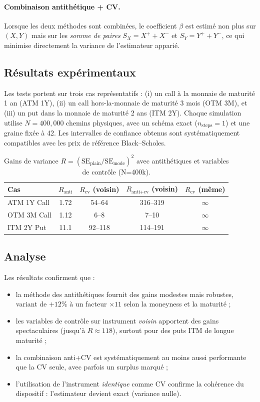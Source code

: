 \documentclass[a4paper,11pt]{article}
\begin{document}
\paragraph{Combinaison antithétique + CV.}
Lorsque les deux méthodes sont combinées, le coefficient $\beta$ est estimé non
plus sur $(X,Y)$ mais sur les \emph{somme de paires}
$S_X=X^{+}+X^{-}$ et $S_Y=Y^{+}+Y^{-}$, ce qui minimise directement la variance
de l’estimateur apparié.

\subsection{Résultats expérimentaux}
Les tests portent sur trois cas représentatifs : (i) un call à la monnaie de
maturité 1 an (ATM 1Y), (ii) un call hors-la-monnaie de maturité 3 mois (OTM 3M),
et (iii) un put dans la monnaie de maturité 2 ans (ITM 2Y). Chaque simulation
utilise $N=400{,}000$ chemins physiques, avec un schéma exact ($n_{\text{steps}}=1$)
et une graine fixée à 42. Les intervalles de confiance obtenus sont systématiquement
compatibles avec les prix de référence Black--Scholes.

\begin{table}[ht]
\centering
\caption{Gains de variance $R=(\mathrm{SE}_{\text{plain}}/\mathrm{SE}_{\text{mode}})^2$
avec antithétiques et variables de contrôle (N=400k).}
\begin{tabular}{lcccc}
\toprule
Cas & $R_{\text{anti}}$ & $R_{\text{cv}}$ (voisin) & $R_{\text{anti+cv}}$ (voisin) & $R_{\text{cv}}$ (même) \\
\midrule
ATM 1Y Call & 1.72 & 54--64 & 316--319 & $\infty$ \\
OTM 3M Call & 1.12 & 6--8   & 7--10    & $\infty$ \\
ITM 2Y Put  & 11.1 & 92--118 & 114--191 & $\infty$ \\
\bottomrule
\end{tabular}
\end{table}

\subsection{Analyse}
Les résultats confirment que :
\begin{itemize}
  \item la méthode des antithétiques fournit des gains modestes mais robustes,
  variant de $+12\%$ à un facteur $\times 11$ selon la moneyness et la maturité ;
  \item les variables de contrôle sur instrument \emph{voisin} apportent des
  gains spectaculaires (jusqu’à $R\approx 118$), surtout pour des puts ITM
  de longue maturité ;
  \item la combinaison anti+CV est systématiquement au moins aussi performante
  que la CV seule, avec parfois un surplus marqué ;
  \item l’utilisation de l’instrument \emph{identique} comme CV confirme la
  cohérence du dispositif : l’estimateur devient exact (variance nulle).
\end{itemize}
\end{document}
